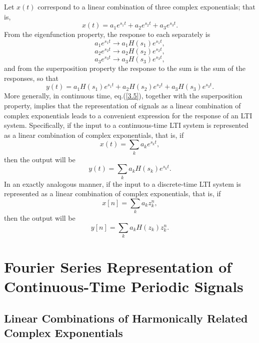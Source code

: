 \documentclass[a4paper,twoside]{book}
\begin{document}
Let $x(t)$ correspond to a linear combination of three complex exponentials; that is,
\begin{equation}
    x(t)=a_1e^{s_1t}+a_2e^{s_2t}+a_3e^{s_3t}.
    \label{3.11}
\end{equation}
From the eigenfunction property, the response to each separately is $$a_1e^{s_1t}\longrightarrow a_1H(s_1)e^{s_1t},$$$$a_2e^{s_2t}\longrightarrow a_2H(s_2)e^{s_2t},$$$$a_3e^{s_3t}\longrightarrow a_3H(s_3)e^{s_3t},$$ and from the superposition property the response to the sum is the sum of the responses, so that
\begin{equation}
    y(t)=a_1H(s_1)e^{s_1t}+a_2H(s_2)e^{s_2t}+a_3H(s_3)e^{s_3t}.
    \label{3.12}
\end{equation}
More generally, in continuous time, eq.\;(\ref{3.5}), together with the superposition property, implies that the representation of signals as a linear combination of complex exponentials leads to a convenient expression for the response of an LTI system. Specifically, if the input to a continuous-time LTI system is represented as a linear combination of complex exponentials, that is, if
\begin{equation}
    x(t)=\sum_ka_ke^{s_kt},
    \label{3.13}
\end{equation}
then the output will be
\begin{equation}
    y(t)=\sum_ka_kH(s_k)e^{s_kt}.
    \label{3.14}
\end{equation}
In an exactly analogous manner, if the input to a discrete-time LTI system is represented as a linear combination of complex exponentials, that is, if
\begin{equation}
    x[n]=\sum_ka_kz_k^n,
    \label{3.15}
\end{equation}
then the output will be
\begin{equation}
    y[n]=\sum_ka_kH(z_k)z_k^n.
    \label{3.16}
\end{equation}

\section{Fourier Series Representation of Continuous-Time Periodic Signals}
\label{section:3.3}

\subsection{Linear Combinations of Harmonically Related Complex Exponentials}
\end{document}
